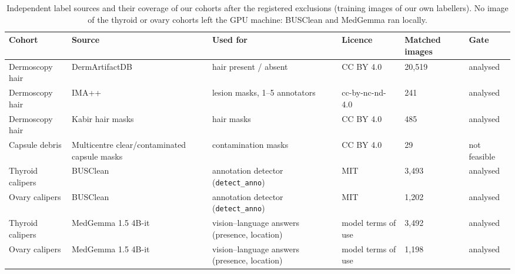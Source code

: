 \begin{table}[H]\centering\scriptsize
\caption{Independent label sources and their coverage of our cohorts after the registered exclusions (training images of our own labellers). No image of the thyroid or ovary cohorts left the GPU machine: BUSClean and MedGemma ran locally.}\label{tab:s16cov}
\begin{tabular}{p{2.2cm}p{3.2cm}p{3.4cm}p{2.4cm}p{1.6cm}p{1.6cm}}\toprule
Cohort & Source & Used for & Licence & Matched images & Gate \\\midrule
Dermoscopy hair & DermArtifactDB & hair present / absent & CC BY 4.0 & 20{,}519 & analysed \\
Dermoscopy hair & IMA{+}{+} & lesion masks, 1--5 annotators & cc-by-nc-nd-4.0 & 241 & analysed \\
Dermoscopy hair & Kabir hair masks & hair masks & CC BY 4.0 & 485 & analysed \\
Capsule debris & Multicentre clear/contaminated capsule masks & contamination masks & CC BY 4.0 & 29 & not feasible \\
Thyroid calipers & BUSClean & annotation detector (\texttt{detect\_anno}) & MIT & 3{,}493 & analysed \\
Ovary calipers & BUSClean & annotation detector (\texttt{detect\_anno}) & MIT & 1{,}202 & analysed \\
Thyroid calipers & MedGemma 1.5 4B-it & vision--language answers (presence, location) & model terms of use & 3{,}492 & analysed \\
Ovary calipers & MedGemma 1.5 4B-it & vision--language answers (presence, location) & model terms of use & 1{,}198 & analysed \\
\bottomrule\end{tabular}
\end{table}
